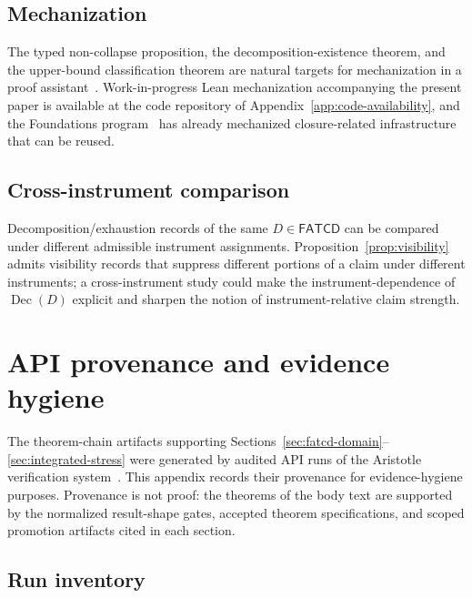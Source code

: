 \documentclass[11pt]{article}
\theoremstyle{definition}
\newcommand{\FATCD}{\ensuremath{\mathsf{FATCD}}}
\newcommand{\Dec}[1]{\ensuremath{\operatorname{Dec}\!\left(#1\right)}}
\begin{document}
\subsection{Mechanization}\label{subsec:future-mechanization}

The typed non-collapse proposition, the decomposition-existence
theorem, and the upper-bound classification theorem are natural
targets for mechanization in a proof
assistant~\citep{DeMouraUllrich2021}. Work-in-progress Lean
mechanization accompanying the present paper is available at the
code repository of Appendix~\ref{app:code-availability}, and the
Foundations program~\citep{Tsiokos2026SixBirdsFoundations} has
already mechanized closure-related infrastructure that can be
reused.

\subsection{Cross-instrument comparison}\label{subsec:future-cross-instrument}

Decomposition/exhaustion records of the same \(D \in \FATCD{}\) can
be compared under different admissible instrument assignments.
Proposition~\ref{prop:visibility} admits visibility records that
suppress different portions of a claim under different instruments; a
cross-instrument study could make the instrument-dependence of
\(\Dec{D}\) explicit and sharpen the notion of instrument-relative
claim strength.
 
\appendix
\section{API provenance and evidence hygiene}\label{app:api-provenance}



The theorem-chain artifacts supporting
Sections~\ref{sec:fatcd-domain}--\ref{sec:integrated-stress} were
generated by audited API runs of the Aristotle verification
system~\citep{Achim2025Aristotle}.
This appendix records their provenance for evidence-hygiene purposes.
Provenance is not proof: the theorems of the body text are supported
by the normalized result-shape gates, accepted theorem
specifications, and scoped promotion artifacts cited in each section.

\subsection{Run inventory}\label{app:run-inventory}
\end{document}
